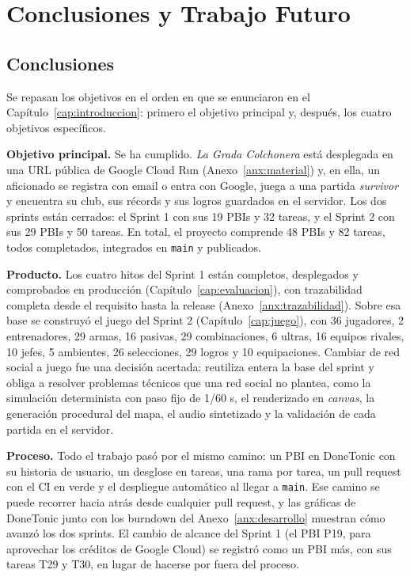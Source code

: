 \chapter{Conclusiones y Trabajo Futuro}
\label{cap:conclusiones}

\section{Conclusiones}
\label{sec:conclusiones}

Se repasan los objetivos en el orden en que se enunciaron en el Capítulo~\ref{cap:introduccion}: primero el objetivo principal y, después, los cuatro objetivos específicos.

\textbf{Objetivo principal.} Se ha cumplido. \textit{La Grada Colchonera} está desplegada en una URL pública de Google Cloud Run (Anexo~\ref{anx:material}) y, en ella, un aficionado se registra con email o entra con Google, juega a una partida \textit{survivor} y encuentra su club, sus récords y sus logros guardados en el servidor. Los dos sprints están cerrados: el Sprint 1 con sus 19 PBIs y 32 tareas, y el Sprint 2 con sus 29 PBIs y 50 tareas. En total, el proyecto comprende 48 PBIs y 82 tareas, todos completados, integrados en \texttt{main} y publicados.

\textbf{Producto.} Los cuatro hitos del Sprint 1 están completos, desplegados y comprobados en producción (Capítulo~\ref{cap:evaluacion}), con trazabilidad completa desde el requisito hasta la release (Anexo~\ref{anx:trazabilidad}). Sobre esa base se construyó el juego del Sprint 2 (Capítulo~\ref{cap:juego}), con 36 jugadores, 2 entrenadores, 29 armas, 16 pasivas, 29 combinaciones, 6 ultras, 16 equipos rivales, 10 jefes, 5 ambientes, 26 selecciones, 29 logros y 10 equipaciones. Cambiar de red social a juego fue una decisión acertada: reutiliza entera la base del sprint y obliga a resolver problemas técnicos que una red social no plantea, como la simulación determinista con paso fijo de 1/60 s, el renderizado en \textit{canvas}, la generación procedural del mapa, el audio sintetizado y la validación de cada partida en el servidor.

\textbf{Proceso.} Todo el trabajo pasó por el mismo camino: un PBI en DoneTonic con su historia de usuario, un desglose en tareas, una rama por tarea, un pull request con el CI en verde y el despliegue automático al llegar a \texttt{main}. Ese camino se puede recorrer hacia atrás desde cualquier pull request, y las gráficas de DoneTonic junto con los burndown del Anexo~\ref{anx:desarrollo} muestran cómo avanzó los dos sprints. El cambio de alcance del Sprint 1 (el PBI P19, para aprovechar los créditos de Google Cloud) se registró como un PBI más, con sus tareas T29 y T30, en lugar de hacerse por fuera del proceso.

